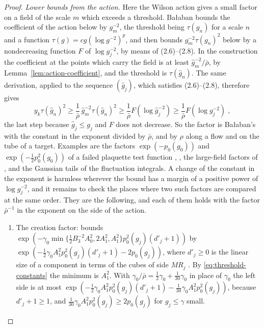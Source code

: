 \documentclass[11pt]{preprint}
\numberwithin{equation}{section}
\theoremstyle{definition}
\theoremstyle{remark}
\theoremstyle{plain}
\begin{document}
\begin{proof}
\emph{Lower bounds from the action.} Here the Wilson action gives a small factor on a field of the scale $m$ which exceeds a threshold. Ba{\l}aban bounds the coefficient of the action below by $g_m^{-2}$, the threshold being $\tau(g_n)$ for a scale $n$ and a function $\tau(g) = cg(\log g^{-2})^p$, and then bounds $g_m^{-2}\tau(g_n)^2$ below by a nondecreasing function $F$ of $\log g_j^{-2}$, by means of (2.6)--(2.8). In the construction the coefficient at the points which carry the field is at least $\hat g_m^{-2}/\bar\rho$, by Lemma~\ref{lem:action-coefficient}, and the threshold is $\tau(\hat g_n)$. The same derivation, applied to the sequence $(\hat g_j)$, which satisfies (2.6)--(2.8), therefore gives
\begin{equation}\label{eq:action-comparison}
    y_k\tau(\hat g_n)^2 \geq \frac{1}{\bar\rho}\,\hat g_m^{-2}\tau(\hat g_n)^2 \geq \frac{1}{\bar\rho}F(\log\hat g_j^{-2}) \geq \frac{1}{\bar\rho}F(\log g_j^{-2})\;,
\end{equation}
the last step because $\hat g_j \leq g_j$ and $F$ does not decrease. So the factor is Ba{\l}aban's with the constant in the exponent divided by $\bar\rho$, and by $\rho$ along a flow and on the tube of a target. Examples are the factors $\exp(-p_0(g_0))$ and $\exp(-\frac12p_0^2(g_0))$ of a failed plaquette test function \cite[p.~175]{BalabanLFR1}, \cite[p.~244]{BalabanCRE}, the large-field factors of \cite[pp.~380--385]{BalabanLFR2}, and the Gaussian tails of the fluctuation integrals. A change of the constant in the exponent is harmless wherever the bound has a margin of a positive power of $\log g_j^{-2}$, and it remains to check the places where two such factors are compared at the same order. They are the following, and each of them holds with the factor $\bar\rho^{-1}$ in the exponent on the side of the action.
\begin{enumerate}[label=(\roman*)]
\item The creation factor: \cite[p.~381]{BalabanLFR2} bounds $\exp(-\gamma_0\min\{\frac12B_3^{-2}A_0^2, 2A_1^2, A_1^2\}p_0^2(g_j)(d'_j + 1))$ by $\exp(-\frac12\gamma_0A_1^2p_0^2(g_j)(d'_j + 1) - 2p_0(g_j))$, where $d'_j \geq 0$ is the linear size of a component in terms of the cubes of side $MR_j$ \cite[p.~380]{BalabanLFR2}. By \eqref{eq:threshold-constants} the minimum is $A_1^2$. With $\gamma_0/\bar\rho = \frac12\gamma_0 + \frac{1}{30}\gamma_0$ in place of $\gamma_0$ the left side is at most $\exp(-\frac12\gamma_0A_1^2p_0^2(g_j)(d'_j + 1) - \frac{1}{30}\gamma_0A_1^2p_0^2(g_j))$, because $d'_j + 1 \geq 1$, and $\frac{1}{30}\gamma_0A_1^2p_0^2(g_j) \geq 2p_0(g_j)$ for $g_j \leq \gamma$ small.

\end{enumerate}
\end{proof}
\end{document}
